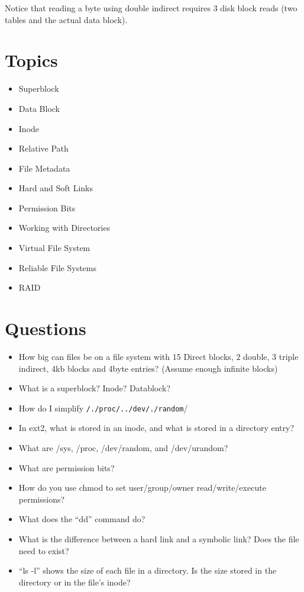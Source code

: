 Notice that reading a byte using double indirect requires 3 disk block
reads (two tables and the actual data block).

\section{Topics}\label{topics}

\begin{itemize}
\tightlist
\item
  Superblock
\item
  Data Block
\item
  Inode
\item
  Relative Path
\item
  File Metadata
\item
  Hard and Soft Links
\item
  Permission Bits
\item
  Working with Directories
\item
  Virtual File System
\item
  Reliable File Systems
\item
  RAID
\end{itemize}

\section{Questions}\label{questions}

\begin{itemize}
\tightlist
\item
  How big can files be on a file system with 15 Direct blocks, 2 double,
  3 triple indirect, 4kb blocks and 4byte entries? (Assume enough
  infinite blocks)
\item
  What is a superblock? Inode? Datablock?
\item
  How do I simplify \texttt{/./proc/../dev/./random}/
\item
  In ext2, what is stored in an inode, and what is stored in a directory
  entry?
\item
  What are /sys, /proc, /dev/random, and /dev/urandom?
\item
  What are permission bits?
\item
  How do you use chmod to set user/group/owner read/write/execute
  permissions?
\item
  What does the ``dd'' command do?
\item
  What is the difference between a hard link and a symbolic link? Does
  the file need to exist?
\item
  ``ls -l'' shows the size of each file in a directory. Is the size
  stored in the directory or in the file's inode?
\end{itemize}
